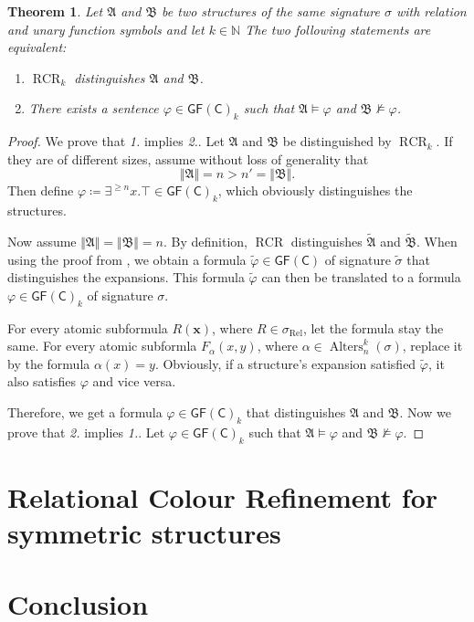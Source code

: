 \documentclass[a4paper,11pt,DIV=15]{scrartcl} %
\renewcommand{\phi}{\varphi}
\theoremstyle{plain}
\newtheorem{theorem}{Theorem}
\theoremstyle{definition}
\newcommand{\GFC}{\mathsf{GF}(\mathsf{C})}
\newcommand{\RCR}{\operatorname{RCR}}
\begin{document}
\begin{theorem}
	Let $\mathfrak A$ and $\mathfrak B$ be two structures of the same signature $\sigma$ with relation and unary function symbols and let $k\in \mathbb{N}$
	The two following statements are equivalent:
	\begin{enumerate}
		\item $\RCR_k$ distinguishes $\mathfrak A$ and $\mathfrak B$.
		\item There exists a sentence $\phi\in\GFC_k$ such that $\mathfrak A\models \phi$ and $\mathfrak B\not\models \phi$.
	\end{enumerate}
\end{theorem}
\begin{proof}
	We prove that \emph{1.} implies \emph{2.}. 
	Let $\mathfrak A$ and $\mathfrak B$ be distinguished by $\RCR_k$.
	If they are of different sizes, assume without loss of generality that 
	$$\Vert \mathfrak A \Vert =n > n'=\Vert \mathfrak B \Vert.$$
	Then define $\phi\coloneqq \exists^{\geq n} x. \top\in \GFC_k$, which obviously distinguishes the structures.
	
	Now assume $\Vert \mathfrak A\Vert = \Vert \mathfrak B \Vert = n$.
	By definition, $\RCR$ distinguishes $\widetilde{\mathfrak A}$ and $\widetilde{\mathfrak B}$.
	When using the proof from \cite{scheidt2025ColorRefinement}, we obtain a formula $\widetilde{\phi}\in \GFC$ of signature $\widetilde{\sigma}$ that distinguishes the expansions.
	This formula $\widetilde{\phi}$ can then be translated to a formula $\phi\in\GFC_k$ of signature $\sigma$.
	
	For every atomic subformula $R(\mathbf x)$, where $R\in \sigma_{\operatorname{Rel}}$, let the formula stay the same.
	For every atomic subformla $F_\alpha(x,y)$, where $\alpha\in \operatorname{Alters}_n^k(\sigma)$, replace it by the formula $\alpha(x)=y$. Obviously, if a structure's expansion satisfied $\widetilde{\phi}$, it also satisfies $\phi$ and vice versa.
	
	Therefore, we get a formula $\phi\in \GFC_k$ that distinguishes $\mathfrak A$ and $\mathfrak B$.
	\break
	Now we prove that \emph{2.} implies \emph{1.}.
	Let $\phi\in \GFC_k$ such that $\mathfrak A\models \phi$ and $\mathfrak B\not\models \phi$.
	
\end{proof}



\section {Relational Colour Refinement for symmetric structures}

\lipsum[3-4]

\section{Conclusion}

\lipsum[2-3]


\clearpage



\end{document}
